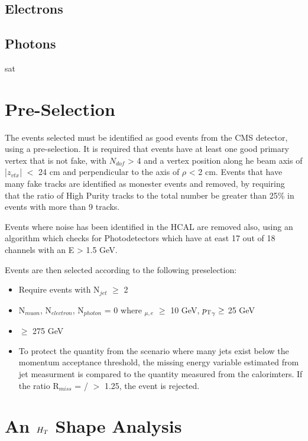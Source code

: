 \subsection{Electrons}
\subsection{Photons}sat

\section{Pre-Selection}

The events selected must be identified as good events from the CMS detector, using a pre-selection. It is required that events have at least one good primary vertex that is not fake, with $N_{dof}$ > 4 and a vertex position along he beam axis of |$z_{vtx}$| $<$ 24 cm and perpendicular to the axis of $\rho$ < 2 cm. Events that have many fake tracks are identified as monester events and removed, by requiring that the ratio of High Purity tracks to the total number be greater than 25\% in events with more than 9 tracks. 

Events where noise has been identified in the HCAL are removed also, using an algorithm which checks for Photodetectors which have at east 17 out of 18 channels with an E > 1.5 GeV.

Events are then selected according to the following preselection:

\begin{itemize}
\item{Require events with N$_{jet}$ $\geq$ 2}
\item{N$_{muon}$, N$_{electron}$, N$_{photon}$ = 0 where \Pt$_{\mu,e}$ $\geq$ 10 GeV, ${p_{\text T}}_{\gamma} \geq$ 25 GeV}
\item{\HT $\geq$ 275 GeV }

\item{To protect the quantity \alt from the scenario where many jets exist below the momentum acceptance threshold, the missing energy variable \mht estimated from jet measurment is compared to the quantity \met measured from the calorimters. If the ratio R$_{miss}$ = \mht / \met $>$ 1.25, the event is rejected. 
}
\end{itemize}




\section{An $H_{T} $ Shape Analysis}

